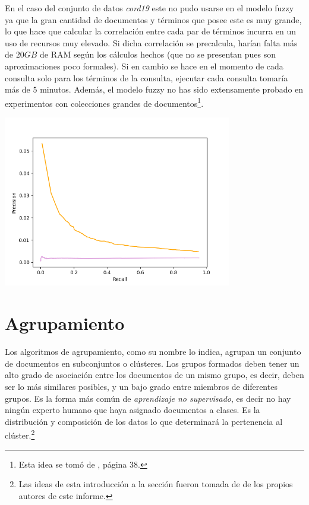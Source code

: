 \documentclass{llncs}
\begin{document}
	En el caso del conjunto de datos \emph{cord19} este no pudo usarse en el modelo fuzzy ya que la gran cantidad de documentos y t\'erminos que posee este es muy grande, lo que hace que calcular la correlaci\'on entre cada par de t\'erminos incurra en un uso de recursos muy elevado. Si dicha correlaci\'on se precalcula, har\'ian falta m\'as de $20 GB$ de RAM seg\'un los c\'alculos hechos (que no se presentan pues son aproximaciones poco formales). Si en cambio se hace en el momento de cada consulta solo para los t\'erminos de la consulta, ejecutar cada consulta tomar\'ia m\'as de $5$ minutos. Adem\'as, el modelo fuzzy no has sido extensamente probado en experimentos con colecciones grandes de documentos\footnote{Esta idea se tom\'o de \cite{B2}, p\'agina $38$.}.
	
	\begin{center}
		\includegraphics[width=10cm]{fuzzy}
	\end{center}	
	
    \section{Agrupamiento}
	
	Los algoritmos de agrupamiento, como su nombre lo indica, agrupan un conjunto de documentos en subconjuntos o clústeres. Los grupos formados deben tener un alto grado de asociación entre los documentos de un mismo grupo, es decir, deben ser lo m\'as similares posibles, y un bajo grado entre miembros de diferentes grupos. Es la forma más común de \textit{aprendizaje no supervisado}, es decir no hay ningún experto humano que haya asignado documentos a clases. Es la distribución y composición de los datos lo que determinará la pertenencia al clúster.\footnote{Las ideas de esta introducci\'on a la secci\'on fueron tomada de \cite{B6} de los propios autores de este informe.}
	
\end{document}

